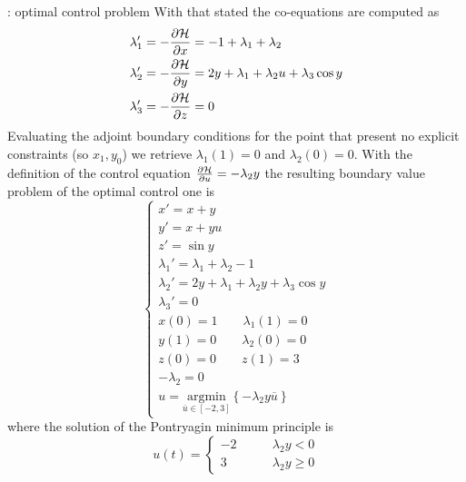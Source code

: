\begin{example}{: optimal control problem}
	With that stated the co-equations are computed as
	\begin{align*}
		\lambda_1' & = - \frac{\partial \mathcal{H}}{\partial x} = -1 + \lambda_1 + \lambda_2 \\
		\lambda_2' & = - \frac{\partial \mathcal{H}}{\partial y} = 2y + \lambda_1 + \lambda_2 u + \lambda_3 \cos y \\
		\lambda_3' & = - \frac{\partial \mathcal{H}}{\partial z} = 0
	\end{align*}
	Evaluating the adjoint boundary conditions for the point that present no explicit constraints (so $x_1, y_0$) we retrieve $\lambda_1(1) = 0$ and $\lambda_2(0) = 0$. With the definition of the control equation $\frac{\partial \mathcal{H}}{\partial u} =  - \lambda_2 y$ the resulting boundary value problem of the optimal control one is
	\[ \begin{cases}
		x' = x+y \\ y' = x + yu \\ z' = \sin y \\ 
		\lambda_1' = \lambda_1 + \lambda_2 - 1 \\ 
		\lambda_2' = 2y + \lambda_1 + \lambda_2 y + \lambda_3 \cos y \\
		\lambda_3' = 0 \\
		x(0) = 1 \qquad \lambda_1(1) = 0 \\ y(1) = 0 \qquad \lambda_2(0) = 0 \\
		z(0) = 0 \qquad z(1) = 3 \\
		-\lambda_2 = 0 \\
		u = \underset{\overline u \in [-2,3]}{\textrm{argmin}} \left\{ -\lambda_2 y \overline u \right\} 
	\end{cases} \]
	where the solution of the Pontryagin minimum principle is 
	\[ u(t) = \begin{cases}
		-2 \qquad & \lambda_2 y < 0 \\
		3 & \lambda_2 y \geq 0 
	\end{cases} \]
\end{example}



